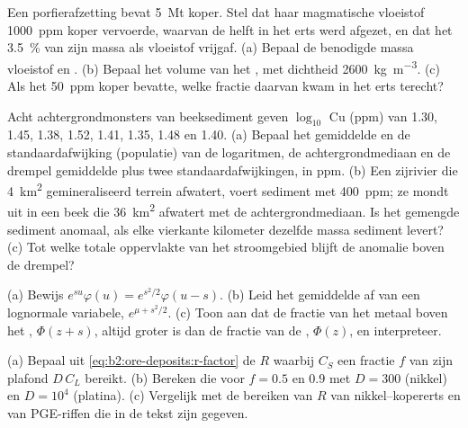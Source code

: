 \begin{exercise}[$\star\star$]\label{exo:b2:ore-deposits:8}
Een porfierafzetting bevat \qty{5}{Mt} koper. Stel dat haar magmatische vloeistof \qty{1000}{ppm}
koper vervoerde, waarvan de helft in het erts werd afgezet, en dat het  \qty{3.5}{\percent}
van zijn massa als vloeistof vrijgaf. (a) Bepaal de benodigde massa vloeistof en . (b) Bepaal het volume van het
, met dichtheid \qty{2600}{kg.m^{-3}}. (c) Als het  \qty{50}{ppm} koper bevatte, welke fractie
daarvan kwam in het erts terecht?
\end{exercise}

\begin{exercise}[$\star\star$]\label{exo:b2:ore-deposits:9}
Acht achtergrondmonsters van beeksediment geven $\log_{10}$ Cu (ppm) van 1.30, 1.45, 1.38, 1.52, 1.41, 1.35,
1.48 en 1.40. (a) Bepaal het gemiddelde en de standaardafwijking (populatie) van de logaritmen, de
achtergrondmediaan en de drempel gemiddelde plus twee standaardafwijkingen, in ppm. (b) Een zijrivier
die \qty{4}{km^2} gemineraliseerd terrein afwatert, voert sediment met \qty{400}{ppm}; ze mondt uit in een beek
die \qty{36}{km^2} afwatert met de achtergrondmediaan. Is het gemengde sediment anomaal, als elke vierkante kilometer dezelfde
massa sediment levert? (c) Tot welke totale oppervlakte van het stroomgebied blijft de
anomalie boven de drempel?
\end{exercise}

\begin{exercise}[$\star\star\star$]\label{exo:b2:ore-deposits:10}
(a) Bewijs $e^{su}\varphi(u) = e^{s^2/2}\varphi(u - s)$. (b) Leid het gemiddelde af van een lognormale
variabele, $e^{\mu + s^2/2}$. (c) Toon aan dat de fractie van het metaal boven het ,
$\Phi(z + s)$, altijd groter is dan de fractie van de , $\Phi(z)$, en interpreteer.
\end{exercise}

\begin{exercise}[$\star\star\star$]\label{exo:b2:ore-deposits:11}
(a) Bepaal uit \eqref{eq:b2:ore-deposits:r-factor} de $R$ waarbij $C_S$ een fractie $f$
van zijn plafond $D\,C_L$ bereikt. (b) Bereken die voor $f = 0.5$ en $0.9$ met $D = 300$ (nikkel) en $D =
10^4$ (platina). (c) Vergelijk met de bereiken van $R$ van nikkel--kopererts en van PGE-riffen die
in de tekst zijn gegeven.
\end{exercise}

